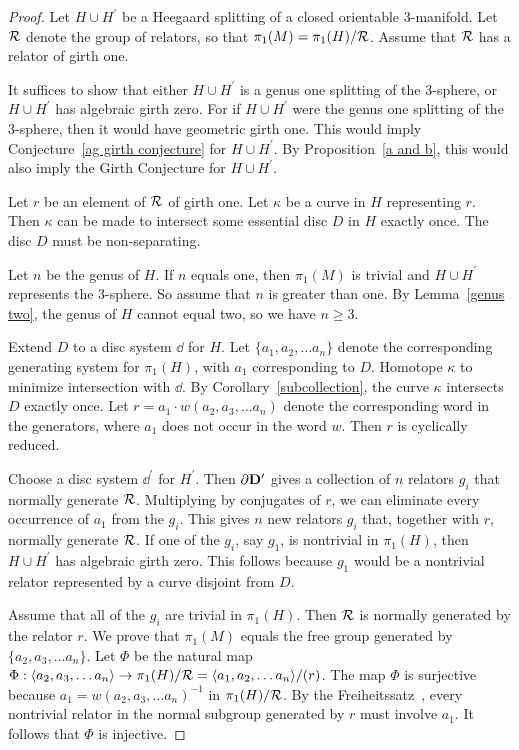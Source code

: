 \begin{proof}
Let $H\cup H^\prime$ be a Heegaard splitting of a closed orientable 3-manifold.  Let $\mathcal{R}$ denote the group of relators, so that $\pi_1(M)=\pi_1(H)/\mathcal{R}$.  Assume that $\mathcal{R}$ has a relator of girth one.

It suffices to show that either $H\cup H^\prime$ is a genus one splitting of the 3-sphere, or $H\cup H^\prime$ has algebraic girth zero.  For if $H\cup H^{\prime}$ were the genus one splitting of the 3-sphere, then it would have geometric girth one.  This would imply Conjecture~\ref{ag girth conjecture} for $H\cup H^{\prime}$.  By Proposition~\ref{a and b}, this would also imply the Girth Conjecture for $H\cup H^{\prime}$.

Let $r$ be an element of $\mathcal{R}$ of girth one.  Let $\kappa$ be a curve in $H$ representing $r$.  Then $\kappa$ can be made to intersect some essential disc $D$ in $H$ exactly once.  The disc $D$ must be non-separating.

Let $n$ be the genus of $H$.  If $n$ equals one, then $\pi_1(M)$ is trivial and $H\cup H^\prime$ represents the 3-sphere.  So assume that $n$ is greater than one.  By Lemma~\ref{genus two}, the genus of $H$ cannot equal two, so we have $n\geq 3$.

Extend $D$ to a disc system $\dd$ for $H$.  Let $\{a_{1}, a_{2}, \ldots a_{n}\}$ denote the corresponding generating system for $\pi_{1}(H)$, with $a_{1}$ corresponding to $D$.  Homotope $\kappa$ to minimize intersection with $\dd$.  By Corollary~\ref{subcollection}, the curve $\kappa$ intersects $D$ exactly once.  Let $r=a_{1}\cdot w(a_{2}, a_{3}, \ldots a_{n})$ denote the corresponding word in the generators, where $a_{1}$ does not occur in the word $w$.  Then $r$ is cyclically reduced.

Choose a disc system $\dd^{\prime}$ for $H^\prime$.  Then $\partial\mathbf{D}^{\prime}$ gives a collection of $n$ relators $g_i$ that normally generate $\mathcal{R}$.
Multiplying by conjugates of $r$, we can eliminate every occurrence of $a_{1}$ from the $g_{i}$.  This gives $n$ new relators $g_i$ that, together with $r$,
normally generate $\mathcal{R}$.  If one of the $g_{i}$, say $g_{1}$, is nontrivial in $\pi_{1}(H)$, then $H\cup H^{\prime}$ has algebraic girth zero.  This follows because $g_{1}$ would be a nontrivial relator represented by a curve disjoint from $D$.

Assume that all of the $g_{i}$ are trivial in $\pi_{1}(H)$.  Then $\mathcal{R}$ is normally generated by the relator $r$.  We prove that $\pi_{1}(M)$ equals the free group generated by $\{ a_{2}, a_{3}, \ldots a_{n}\}$.  Let $\Phi$ be the natural map $\Phi:\langle a_{2}, a_{3}, \ldots a_{n} \rangle\rightarrow\pi_{1}(H)/\mathcal{R}=\langle a_{1}, a_{2}, \ldots a_{n} \rangle/ (r)$.  The map $\Phi$ is surjective because $a_{1}=w(a_{2}, a_{3}, \ldots a_{n})^{-1}$ in $\pi_{1}(H)/\mathcal{R}$.  By the Freiheitssatz~\cite[Thm. 4.10]{MKS}, every nontrivial relator in the normal subgroup generated by $r$ must involve $a_{1}$.  It follows that $\Phi$ is injective.


\end{proof}
